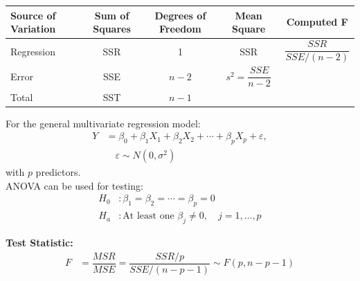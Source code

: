 \begin{table}[H]
\centering
\renewcommand{\arraystretch}{1.4}
\begin{tabular}{lcccc}
\toprule
\textbf{Source of Variation} & \textbf{Sum of Squares} & \textbf{Degrees of Freedom} & \textbf{Mean Square} & \textbf{Computed F} \\
\midrule
Regression & SSR & 1 & SSR & $\dfrac{SSR}{SSE / (n - 2)}$ \\
Error & SSE & $n - 2$ & $s^2 = \dfrac{SSE}{n - 2}$ & \\
Total & SST & $n - 1$ & & \\
\bottomrule
\end{tabular}
\end{table}


For the general multivariate regression model:
\begin{align*}
    Y &= \beta_0 + \beta_1 X_1 + \beta_2 X_2 + \cdots + \beta_p X_p + \varepsilon, \\
      &\quad \varepsilon \sim N(0, \sigma^2)
\end{align*}
with $p$ predictors.\\

ANOVA can be used for testing:
\begin{align*}
    H_0&: \beta_1 = \beta_2 = \cdots = \beta_p = 0 \\
    H_a&: \text{At least one } \beta_j \ne 0, \quad j = 1, \ldots, p
\end{align*}

\textbf{Test Statistic:}
\begin{align*}
    F &= \dfrac{MSR}{MSE} = \dfrac{SSR/p}{SSE / (n - p - 1)} \sim F(p, n - p - 1)
\end{align*}

